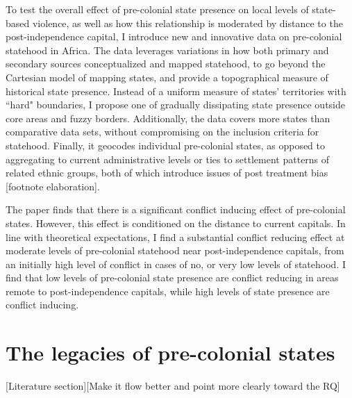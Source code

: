\documentclass[12pt]{article}
\begin{document}
To test the overall effect of pre-colonial state presence on local levels of
state-based violence, as well as how this relationship is moderated by distance
to the post-independence capital, I introduce new and innovative data on
pre-colonial statehood in Africa. The data leverages variations in how both
primary and secondary sources conceptualized and mapped statehood, to go beyond
the Cartesian model of mapping states, and provide a topographical measure of
historical state presence. Instead of a uniform measure of states' territories
with ``hard" boundaries, I propose one of gradually dissipating state presence
outside core areas and fuzzy borders. Additionally, the data covers more states
than comparative data sets, without compromising on the inclusion criteria for
statehood. Finally, it geocodes individual pre-colonial states, as opposed to
aggregating to current administrative levels or ties to settlement patterns of
related ethnic groups, both of which introduce issues of post treatment bias
[footnote elaboration]. 

The paper finds that there is a significant conflict inducing effect of
pre-colonial states. However, this effect is conditioned on the distance to
current capitals. In line with theoretical expectations, I find a substantial
conflict reducing effect at moderate levels of pre-colonial statehood near
post-independence capitals, from an initially high level of conflict in cases of
no, or very low levels of statehood. I find that low levels of pre-colonial
state presence are conflict reducing in areas remote to post-independence
capitals, while high levels of state presence are conflict inducing. 

\section{The legacies of pre-colonial states} 
\label{The legacies of pre-colonial states}

[Literature section][Make it flow better and point more clearly toward the RQ]
\end{document}
